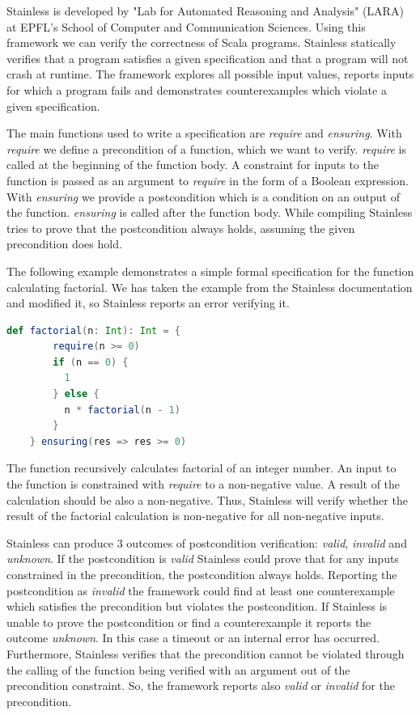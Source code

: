 Stainless is developed by "Lab for Automated Reasoning and Analysis" (LARA) at EPFL's School of Computer and Communication Sciences.
Using this framework we can verify the correctness of Scala programs.
Stainless statically verifies that a program satisfies a given specification and that a program will not crash at runtime.
The framework explores all possible input values, reports inputs for which a program fails and demonstrates counterexamples which violate a given specification.\cite{Stainless:introduction}

The main functions used to write a specification are \textit{require} and \textit{ensuring}. 
With \textit{require} we define a precondition of a function, which we want to verify.
\textit{require} is called at the beginning of the function body.
A constraint for inputs to the function is passed as an argument to \textit{require} in the form of a Boolean expression.
With \textit{ensuring} we provide a postcondition which is a condition on an output of the function.
\textit{ensuring} is called after the function body.
While compiling Stainless tries to prove that the postcondition always holds, assuming the given precondition does hold.\cite{Stainless:introduction}

The following example demonstrates a simple formal specification for the function calculating factorial.
We has taken the example from the Stainless documentation \cite{Stainless:introduction} and modified it, so Stainless reports an error verifying it.

\begin{lstlisting}[language=Scala]
    def factorial(n: Int): Int = {
        require(n >= 0)
        if (n == 0) {
          1
        } else {
          n * factorial(n - 1)
        }
    } ensuring(res => res >= 0)
\end{lstlisting}

The function recursively calculates factorial of an integer number.
An input to the function is constrained with \textit{require} to a non-negative value.
A result of the calculation should be also a non-negative.
Thus, Stainless will verify whether the result of the factorial calculation is non-negative for all non-negative inputs.

Stainless can produce 3 outcomes of postcondition verification: \textit{valid}, \textit{invalid} and \textit{unknown}.
If the postcondition is \textit{valid} Stainless could prove that for any inputs constrained in the precondition, the postcondition always holds.
Reporting the postcondition as \textit{invalid} the framework could find at least one counterexample which satisfies the precondition but violates the postcondition.
If Stainless is unable to prove the postcondition or find a counterexample it reports the outcome \textit{unknown}.
In this case a timeout or an internal error has occurred.
Furthermore, Stainless verifies that the precondition cannot be violated through the calling of the function being verified with an argument out of the precondition constraint.
So, the framework reports also \textit{valid} or \textit{invalid} for the precondition. \cite{Stainless:introduction}


